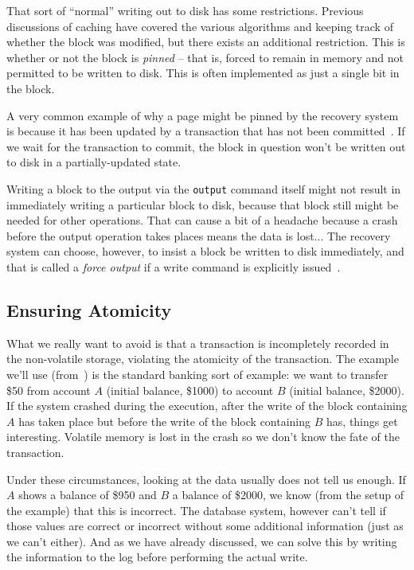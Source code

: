 \documentclass[a4paper]{report}
\begin{document}
That sort of ``normal'' writing out to disk has some restrictions. Previous discussions of caching have covered the various algorithms and keeping track of whether the block was modified, but there exists an additional restriction. This is whether or not the block is \textit{pinned} -- that is, forced to remain in memory and not permitted to be written to disk. This is often implemented as just a single bit in the block.

A very common example of why a page might be pinned by the recovery system is because it has been updated by a transaction that has not been committed~\cite{fds}. If we wait for the transaction to commit, the block in question won't be written out to disk in a partially-updated state.

Writing a block to the output via the \texttt{output} command itself might not result in immediately writing a particular block to disk, because that block still might be needed for other operations. That can cause a bit of a headache because a crash before the output operation takes places means the data is lost... The recovery system can choose, however, to insist a block be written to disk immediately, and that is called a \textit{force output} if a write command is explicitly issued~\cite{dsc}. 

\subsection*{Ensuring Atomicity}

What we really want to avoid is that a transaction is incompletely recorded in the non-volatile storage, violating the atomicity of the transaction. The example we'll use (from~\cite{dsc}) is the standard banking sort of example: we want to transfer \$50 from account $A$ (initial balance, \$1000) to account $B$ (initial balance, \$2000). If the system crashed during the execution, after the write of the block containing $A$ has taken place but before the write of the block containing $B$ has, things get interesting. Volatile memory is lost in the crash so we don't know the fate of the transaction.

Under these circumstances, looking at the data usually does not tell us enough. If $A$ shows a balance of \$950 and $B$ a balance of \$2000, we know (from the setup of the example) that this is incorrect. The database system, however can't tell if those values are correct or incorrect without some additional information (just as we can't either). And as we have already discussed, we can solve this by writing the information to the log before performing the actual write.
\end{document}
